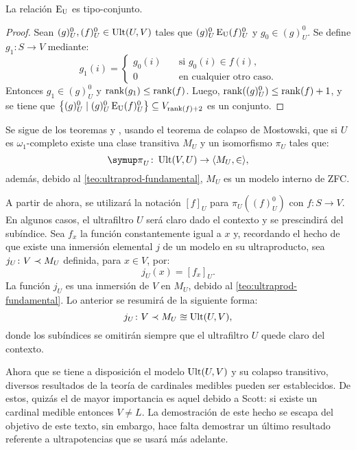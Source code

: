 \begin{teo}\label{teo:Eu-set-like}
    La relación $\operatorname{E_U}$ es tipo-conjunto.
\end{teo}
\begin{proof}
    \def\Ou{^0_U}
    Sean $(g)\Ou, (f)\Ou\in \Ult(U,V)$ tales que $(g)\Ou \Eu (f)\Ou$ y $g_0\in(g)\Ou$.
    Se define $g_1\colon S\to V$ mediante:
    \[
        g_1(i) =
        \begin{cases}
          g_0(i)\quad & \text{si $g_0(i)\in f(i)$,}\\
          0\quad & \text{en cualquier otro caso.}
        \end{cases}
    \]
    Entonces $g_1\in (g)\Ou$ y $\operatorname{rank}(g_1)\leq\operatorname{rank}(f)$. Luego, $\rank((g)\Ou)\leq\rank(f)+1$,
    y se tiene que $\set{(g)\Ou\mid (g)\Ou\Eu (f)\Ou}\subseteq V_{\rank(f)+2}$ es un conjunto.
\end{proof}

Se sigue de los teoremas  y ,
usando el teorema de colapso de Mostowski, que si $U$ es $\omega_1$-completo
existe una clase transitiva $M_U$ y un isomorfismo $\pi_U$ tales que:
\[
    \pi_U\colon\Ult(V,U)\to\op{M_U,\in},
\]
además, debido al \cref{teo:ultraprod-fundamental}, $M_U$ es un modelo interno
de ZFC.

A partir de ahora, se utilizará la notación $[f]_U$ para $\pi_U((f)_U^0)$
con $f\colon S\to V$. En algunos casos, el ultrafiltro $U$ será claro dado el contexto
y se prescindirá del subíndice. Sea $f_x$ la función constantemente igual a $x$ y,
recordando el hecho de que existe una inmersión elemental $j$ de un modelo en su ultraproducto,
sea $j_U\colon V\prec M_U$ definida, para $x\in V$, por:
\[
    j_U(x) = [f_x]_U.
\]
La función $j_U$ es una inmersión de $V$ en $M_U$, debido al \cref{teo:ultraprod-fundamental}.
Lo anterior se resumirá de la siguiente forma:
\[
    j_U\colon V\prec M_U\approxeq\operatorname{Ult}(U,V),
\]
donde los subíndices se omitirán siempre que el ultrafiltro $U$ quede claro
del contexto.

Ahora que se tiene a disposición el modelo $\operatorname{Ult}(U,V)$ y su colapso transitivo,
diversos resultados de la teoría de cardinales medibles pueden ser establecidos.
De estos, quizás el de mayor importancia es aquel debido a Scott: si existe
un cardinal medible entonces $V\neq L$. La demostración de este hecho se
escapa del objetivo de este texto, sin embargo, hace falta demostrar un
último resultado referente a ultrapotencias que se usará más adelante.


